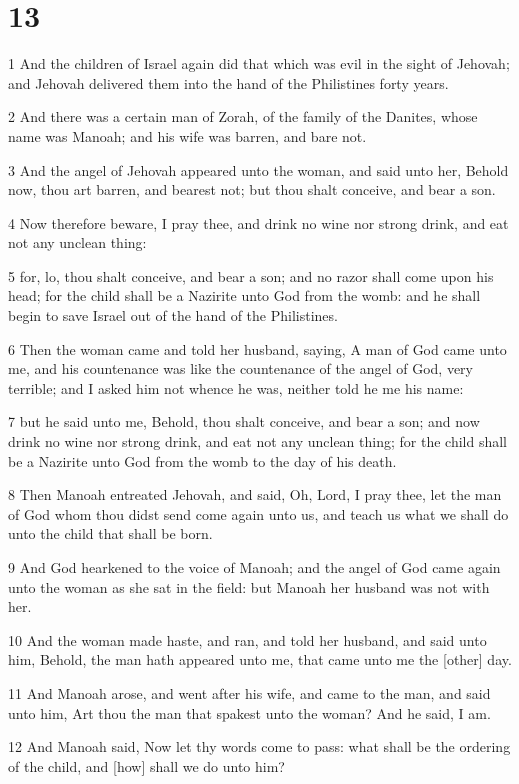 \chapter{13}

\par 1 And the children of Israel again did that which was evil in the sight of Jehovah; and Jehovah delivered them into the hand of the Philistines forty years.
\par 2 And there was a certain man of Zorah, of the family of the Danites, whose name was Manoah; and his wife was barren, and bare not.
\par 3 And the angel of Jehovah appeared unto the woman, and said unto her, Behold now, thou art barren, and bearest not; but thou shalt conceive, and bear a son.
\par 4 Now therefore beware, I pray thee, and drink no wine nor strong drink, and eat not any unclean thing:
\par 5 for, lo, thou shalt conceive, and bear a son; and no razor shall come upon his head; for the child shall be a Nazirite unto God from the womb: and he shall begin to save Israel out of the hand of the Philistines.
\par 6 Then the woman came and told her husband, saying, A man of God came unto me, and his countenance was like the countenance of the angel of God, very terrible; and I asked him not whence he was, neither told he me his name:
\par 7 but he said unto me, Behold, thou shalt conceive, and bear a son; and now drink no wine nor strong drink, and eat not any unclean thing; for the child shall be a Nazirite unto God from the womb to the day of his death.
\par 8 Then Manoah entreated Jehovah, and said, Oh, Lord, I pray thee, let the man of God whom thou didst send come again unto us, and teach us what we shall do unto the child that shall be born.
\par 9 And God hearkened to the voice of Manoah; and the angel of God came again unto the woman as she sat in the field: but Manoah her husband was not with her.
\par 10 And the woman made haste, and ran, and told her husband, and said unto him, Behold, the man hath appeared unto me, that came unto me the [other] day.
\par 11 And Manoah arose, and went after his wife, and came to the man, and said unto him, Art thou the man that spakest unto the woman? And he said, I am.
\par 12 And Manoah said, Now let thy words come to pass: what shall be the ordering of the child, and [how] shall we do unto him?

